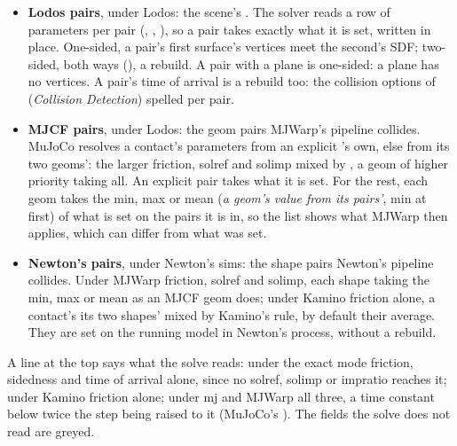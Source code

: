 \begin{itemize}
\item \textbf{Lodos pairs}, under Lodos: the scene's . The solver reads a row of parameters per pair (, , ), so a pair takes exactly what it is set, written in place. One-sided, a pair's first surface's vertices meet the second's SDF; two-sided, both ways (), a rebuild. A pair with a plane is one-sided: a plane has no vertices. A pair's time of arrival is a rebuild too: the collision options of  (\emph{Collision Detection}) spelled per pair.
\item \textbf{MJCF pairs}, under Lodos: the geom pairs MJWarp's pipeline collides. MuJoCo resolves a contact's parameters from an explicit 's own, else from its two geoms': the larger friction, solref and solimp mixed by , a geom of higher priority taking all. An explicit pair takes what it is set. For the rest, each geom takes the min, max or mean (\emph{a geom's value from its pairs'}, min at first) of what is set on the pairs it is in, so the list shows what MJWarp then applies, which can differ from what was set.
\item \textbf{Newton's pairs}, under Newton's sims: the shape pairs Newton's pipeline collides. Under MJWarp friction, solref and solimp, each shape taking the min, max or mean as an MJCF geom does; under Kamino friction alone, a contact's its two shapes' mixed by Kamino's rule, by default their average. They are set on the running model in Newton's process, without a rebuild.
\end{itemize}

A line at the top says what the solve reads: under the exact mode friction, sidedness and time of arrival alone, since no solref, solimp or impratio reaches it; under Kamino friction alone; under mj and MJWarp all three, a time constant below twice the step being raised to it (MuJoCo's ). The fields the solve does not read are greyed.

